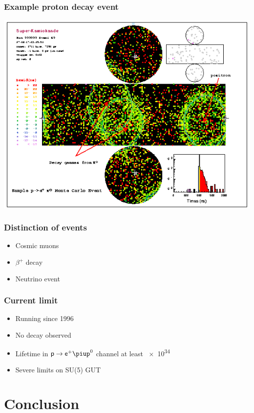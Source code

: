 \documentclass[english, fleqn]{beamer}
\begin{document}
\begin{frame}
    \frametitle{Example proton decay event}

    \centering
    \includegraphics[width=0.8\linewidth]{Figures/epi0_nice_event.png}
    \parencite{boston_university/proton_decay}
\end{frame}

\begin{frame}
    \frametitle{Distinction of events}

    \begin{itemize}
        \item Cosmic muons
        \item $\beta^+$ decay
        \item Neutrino event
    \end{itemize}
\end{frame}

\begin{frame}
    \frametitle{Current limit}

    \begin{itemize}
        \item Running since 1996
        \item No decay observed
            \pause
        \item Lifetime in $\mathsf p \to \mathsf e^+ \piup^0$ channel at least \SI{e34}{\year}
        \item Severe limits on SU(5) GUT
    \end{itemize}

    \parencite{super-k/proton_decay}
\end{frame}

\section*{Conclusion}
\end{document}
